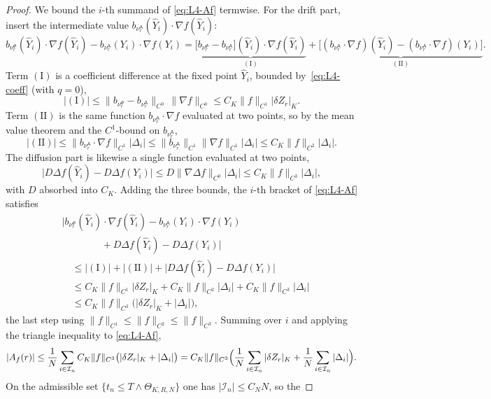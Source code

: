 \documentclass[a4paper,fleqn]{cas-sc}
\theoremstyle{definition}
\theoremstyle{remark}
\begin{document}
\begin{proof}
We bound the $i$-th summand of \eqref{eq:L4-Af} termwise. For the drift part, insert
the intermediate value $b_{\nu^{\mathsf A}_r}(\widehat Y_i)\cdot\nabla f(\widehat Y_i)$:
\[
b_{\nu^\Phi_r}(\widehat Y_i)\!\cdot\!\nabla f(\widehat Y_i)
-b_{\nu^{\mathsf A}_r}(Y_i)\!\cdot\!\nabla f(Y_i)
=\underbrace{\bigl[b_{\nu^\Phi_r}-b_{\nu^{\mathsf A}_r}\bigr](\widehat Y_i)\!\cdot\!\nabla f(\widehat Y_i)}_{(\mathrm I)}
+\underbrace{\bigl[(b_{\nu^{\mathsf A}_r}\!\cdot\!\nabla f)(\widehat Y_i)-(b_{\nu^{\mathsf A}_r}\!\cdot\!\nabla f)(Y_i)\bigr]}_{(\mathrm{II})}.
\]
Term $(\mathrm I)$ is a coefficient difference at the fixed point $\widehat Y_i$, bounded
by~\eqref{eq:L4-coeff} (with $q=0$),
\[
|(\mathrm I)|\le\|b_{\nu^\Phi_r}-b_{\nu^{\mathsf A}_r}\|_{C^0}\,\|\nabla f\|_{C^0}
\le C_K\|f\|_{C^1}|\delta Z_r|_K .
\]
Term $(\mathrm{II})$ is the same function $b_{\nu^{\mathsf A}_r}\!\cdot\!\nabla f$ evaluated at
two points, so by the mean value theorem and the $C^1$-bound on $b_{\nu^{\mathsf A}_r}$,
\[
|(\mathrm{II})|\le\|b_{\nu^{\mathsf A}_r}\!\cdot\!\nabla f\|_{C^1}|\Delta_i|
\le\|b_{\nu^{\mathsf A}_r}\|_{C^1}\|\nabla f\|_{C^1}|\Delta_i|
\le C_K\|f\|_{C^2}|\Delta_i| .
\]
The diffusion part is likewise a single function evaluated at two points,
\[
\bigl|D\Delta f(\widehat Y_i)-D\Delta f(Y_i)\bigr|
\le D\|\nabla\Delta f\|_{C^0}|\Delta_i|\le C_K\|f\|_{C^3}|\Delta_i| ,
\]
with $D$ absorbed into $C_K$. Adding the three bounds, the $i$-th bracket of \eqref{eq:L4-Af} satisfies
\[
\begin{aligned}
&\bigl|b_{\nu^\Phi_r}(\widehat Y_i)\!\cdot\!\nabla f(\widehat Y_i)
-b_{\nu^{\mathsf A}_r}(Y_i)\!\cdot\!\nabla f(Y_i)\\
&\qquad\qquad+D\Delta f(\widehat Y_i)-D\Delta f(Y_i)\bigr|\\
&\quad\le|(\mathrm I)|+|(\mathrm{II})|+\bigl|D\Delta f(\widehat Y_i)-D\Delta f(Y_i)\bigr|\\
&\quad\le C_K\|f\|_{C^1}|\delta Z_r|_K+C_K\|f\|_{C^2}|\Delta_i|+C_K\|f\|_{C^3}|\Delta_i|\\
&\quad\le C_K\|f\|_{C^3}\bigl(|\delta Z_r|_K+|\Delta_i|\bigr),
\end{aligned}
\]
the last step using $\|f\|_{C^1}\le\|f\|_{C^2}\le\|f\|_{C^3}$. Summing over $i$ and applying the
triangle inequality to \eqref{eq:L4-Af},
\[
|A_f(r)|
\le\frac1N\sum_{i\in\mathcal I_n}C_K\|f\|_{C^3}\bigl(|\delta Z_r|_K+|\Delta_i|\bigr)
=C_K\|f\|_{C^3}\Bigl(\frac1N\sum_{i\in\mathcal I_n}|\delta Z_r|_K
+\frac1N\sum_{i\in\mathcal I_n}|\Delta_i|\Bigr).
\]
On the admissible set $\{t_n\le T\wedge\Theta_{K,R,N}\}$ one has $|\mathcal I_n|\le C_NN$, so the

\end{proof}
\end{document}

